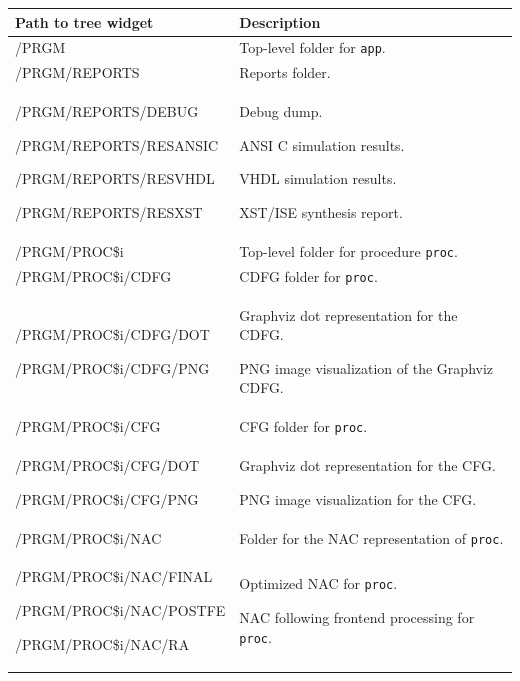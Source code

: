 \documentclass[a4paper]{article}
\newlength{\DUtablewidth} %
\begin{document}
{\footnotesize 
\setlength{\DUtablewidth}{\linewidth}
\begin{longtable*}[c]{|p{0.319\DUtablewidth}|p{0.610\DUtablewidth}|}
\hline

Path to tree widget
 & 
Description
 \\
\hline

/PRGM
 & 
Top-level folder for \texttt{app}.
 \\
\hline

/PRGM/REPORTS
 & 
Reports folder.
 \\
\hline

/PRGM/REPORTS/DEBUG

/PRGM/REPORTS/RESANSIC

/PRGM/REPORTS/RESVHDL

/PRGM/REPORTS/RESXST
 & 
Debug dump.

ANSI C simulation results.

VHDL simulation results.

XST/ISE synthesis report.
 \\
\hline

/PRGM/PROC\$i
 & 
Top-level folder for procedure \texttt{proc}.
 \\
\hline

/PRGM/PROC\$i/CDFG
 & 
CDFG folder for \texttt{proc}.
 \\
\hline

/PRGM/PROC\$i/CDFG/DOT

/PRGM/PROC\$i/CDFG/PNG
 & 
Graphviz dot representation for the CDFG.

PNG image visualization of the Graphviz CDFG.
 \\
\hline

/PRGM/PROC\$i/CFG
 & 
CFG folder for \texttt{proc}.
 \\
\hline

/PRGM/PROC\$i/CFG/DOT

/PRGM/PROC\$i/CFG/PNG
 & 
Graphviz dot representation for the CFG.

PNG image visualization for the CFG.
 \\
\hline

/PRGM/PROC\$i/NAC
 & 
Folder for the NAC representation of \texttt{proc}.
 \\
\hline

/PRGM/PROC\$i/NAC/FINAL

/PRGM/PROC\$i/NAC/POSTFE

/PRGM/PROC\$i/NAC/RA
 & 
Optimized NAC for \texttt{proc}.

NAC following frontend processing for \texttt{proc}.


\end{longtable*}}
\end{document}
